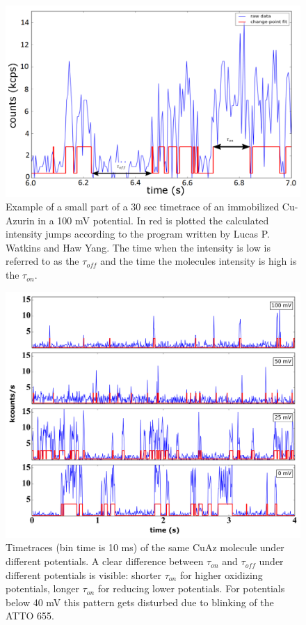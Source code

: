 \documentclass[twoside,single]{lion-msc}
\begin{document}
\begin{figure}[ht!]
\centering
\includegraphics[width=\textwidth]{on_off_test1}
\caption{Example of a small part of a 30 sec timetrace of an immobilized Cu-Azurin in a 100 mV potential. In red is plotted the calculated intensity jumps according to the program written by Lucas P. Watkins and Haw Yang. The time when the intensity is low is referred to as the $\tau_{off}$ and the time the molecules intensity is high is the $\tau_{on}$.}
\label{on_off_times}
\end{figure}

\newpage


\begin{figure}[ht!]
\centering
\includegraphics[width=1\textwidth]{plots_timetraces_diff_pot}
\caption{Timetraces (bin time is 10 ms) of the same CuAz molecule under different potentials. A clear difference between $\tau_{on}$ and $\tau_{off}$ under different potentials is visible: shorter $\tau_{on}$ for higher oxidizing potentials, longer $\tau_{on}$ for reducing lower potentials. For potentials below 40 mV this pattern gets disturbed due to blinking of the ATTO 655.}
\label{plots_timetraces_diff_pot}
\end{figure}
\end{document}
